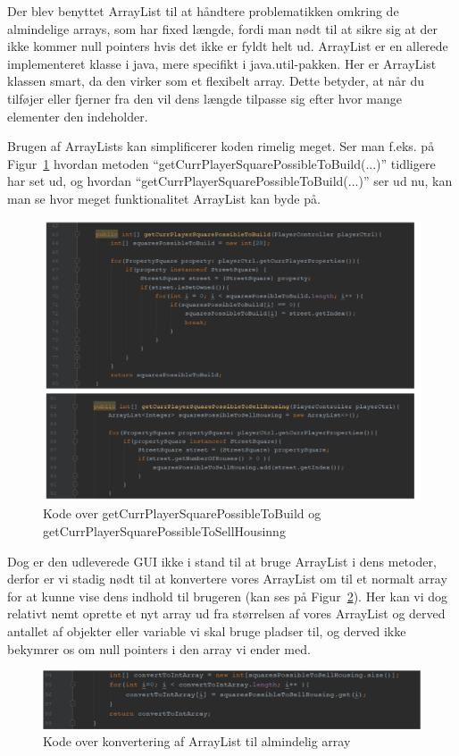 \documentclass[class=article, crop=false]{standalone}
\begin{document}
    Der blev benyttet ArrayList til at håndtere problematikken omkring de almindelige arrays, som har fixed længde, fordi man nødt til at sikre sig at der ikke kommer null pointers hvis det ikke er fyldt helt ud. ArrayList er en allerede implementeret klasse i java, mere specifikt i java.util-pakken. Her er ArrayList klassen smart, da den virker som et flexibelt array. Dette betyder, at når du tilføjer eller fjerner fra den vil dens længde tilpasse sig efter hvor mange elementer den indeholder.\par
    Brugen af ArrayLists kan simplificerer koden rimelig meget. Ser man f.eks. på Figur~\ref{fig:possibletobuildandsell} hvordan metoden “getCurrPlayerSquarePossibleToBuild(...)” tidligere har set ud, og hvordan “getCurrPlayerSquarePossibleToBuild(...)” ser ud nu, kan man se hvor meget funktionalitet ArrayList kan byde på.


    \begin{figure}[H]
        \centering
        \includegraphics[scale=0.6]{pics/possibletobuildandsell}
        \caption{Kode over getCurrPlayerSquarePossibleToBuild og getCurrPlayerSquarePossibleToSellHousinng}\label{fig:possibletobuildandsell}
    \end{figure}
    \newpage
    Dog er den udleverede GUI ikke i stand til at bruge ArrayList i dens metoder, derfor er vi stadig nødt til at konvertere vores ArrayList om til et normalt array for at kunne vise dens indhold til brugeren (kan ses på Figur~\ref{fig:convert_arraylist}). Her kan vi dog relativt nemt oprette et nyt array ud fra størrelsen af vores ArrayList og derved antallet af objekter eller variable vi skal bruge pladser til, og derved ikke bekymrer os om null pointers i den array vi ender med.
    \begin{figure}[H]
        \centering
        \includegraphics[scale=0.6]{pics/convert_arraylist}
        \caption{Kode over konvertering af ArrayList til almindelig array}\label{fig:convert_arraylist}
    \end{figure}
\end{document}
